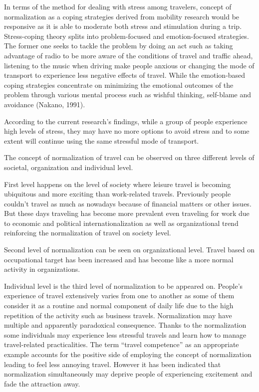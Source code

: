\documentclass[
11pt, %
oneside, %
english, %
singlespacing, %
]{macthesis} %
\begin{document}
In terms of the method for dealing with stress among travelers, concept of normalization as a coping strategies derived from mobility research would be responsive as it is able to moderate both stress and stimulation during a trip. Stress-coping theory splits into problem-focused and emotion-focused strategies. The former one seeks to tackle the problem by doing an act such as taking advantage of radio to be more aware of the conditions of travel and traffic ahead, listening to the music when driving make people anxious or changing the mode of transport to experience less negative effects of travel. While the emotion-based coping strategies concentrate on minimizing the emotional outcomes of the problem through various mental process such as wishful thinking, self-blame and avoidance (Nakano, 1991).

According to the current research's findings, while a group of people experience high levels of stress, they may have no more options to avoid stress and to some extent will continue using the same stressful mode of transport.

The concept of normalization of travel can be observed on three different levels of societal, organization and individual level.

First level happens on the level of society where leisure travel is becoming ubiquitous and more exciting than work-related travels. Previously people couldn't travel as much as nowadays because of financial matters or other issues. But these days traveling has become more prevalent even traveling for work due to economic and political internationalization as well as organizational trend reinforcing the normalization of travel on society level.

Second level of normalization can be seen on organizational level. Travel based on occupational target has been increased and has become like a more normal activity in organizations.

Individual level is the third level of normalization to be appeared on. People's experience of travel extensively varies from one to another as some of them consider it as a routine and normal component of daily life due to the high repetition of the activity such as business travels. Normalization may have multiple and apparently paradoxical consequence. Thanks to the normalization some individuals may experience less stressful travels and learn how to manage travel-related practicalities. The term ``travel competence'' as an appropriate example accounts for the positive side of employing the concept of normalization leading to feel less annoying travel. However it has been indicated that normalization simultaneously may deprive people of experiencing excitement and fade the attraction away.
\end{document}
